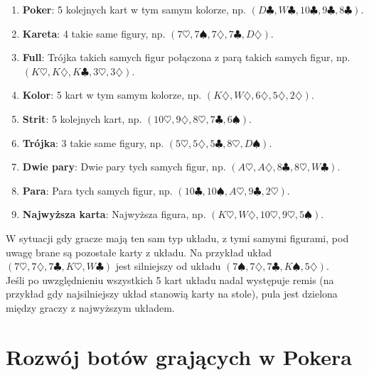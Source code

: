 \documentclass[licencjacka]{pracamgr}
\begin{document}
\begin{enumerate}
\item \textbf{Poker}: 5 kolejnych kart w tym samym kolorze, np. $(D\clubsuit, W\clubsuit, 10\clubsuit, 9\clubsuit, 8\clubsuit)$. 
\item \textbf{Kareta}: 4 takie same figury, np. $(7\heartsuit, 7\spadesuit, 7\diamondsuit, 7\clubsuit, D\diamondsuit)$.
\item \textbf{Full}: Trójka takich samych figur połączona z parą takich samych figur, np. $(K\heartsuit, K\diamondsuit, K\clubsuit, 3\heartsuit, 3\diamondsuit)$. 
\item \textbf{Kolor}: 5 kart w tym samym kolorze, np. $(K\diamondsuit, W\diamondsuit, 6\diamondsuit, 5\diamondsuit, 2\diamondsuit)$.
\item \textbf{Strit}: 5 kolejnych kart, np. $(10\heartsuit, 9\diamondsuit, 8\heartsuit, 7\clubsuit, 6\spadesuit)$.
\item \textbf{Trójka}: 3 takie same figury, np. $(5\heartsuit, 5\diamondsuit, 5\clubsuit, 8\heartsuit, D\spadesuit)$.
\item \textbf{Dwie pary}: Dwie pary tych samych figur, np. $(A\heartsuit, A\diamondsuit, 8\clubsuit, 8\heartsuit, W\clubsuit)$.
\item \textbf{Para}: Para tych samych figur, np. $(10\clubsuit, 10\spadesuit, A\heartsuit, 9\clubsuit, 2\heartsuit)$.
\item \textbf{Najwyższa karta}: Najwyższa figura, np. $(K\heartsuit, W\diamondsuit, 10\heartsuit, 9\heartsuit, 5\spadesuit)$.
\end{enumerate}

\noindent
W sytuacji gdy gracze mają ten sam typ układu, z tymi samymi figurami, pod uwagę brane są pozostałe karty z układu. Na przykład
układ $(7\heartsuit, 7\diamondsuit, 7\clubsuit, K\heartsuit, W\clubsuit)$ jest silniejszy od układu
$(7\spadesuit, 7\diamondsuit, 7\clubsuit, K\spadesuit, 5\diamondsuit)$. \\

\noindent
Jeśli po uwzględnieniu wszystkich 5 kart układu nadal występuje remis (na przykład gdy najsilniejszy układ stanowią karty na stole),
pula jest dzielona między graczy z najwyższym układem.

\section{Rozwój botów grających w Pokera}
\end{document}
